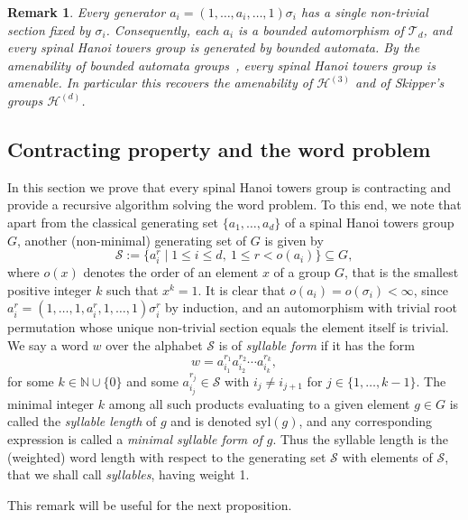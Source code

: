 \documentclass[11pt,leqno]{amsart}
\theoremstyle{plain}
\newtheorem{remark}[remark]{Remark}
\newcommand\T{{\mathcal{T}}}
\newcommand{\Syl}{\mathrm{syl}}
\numberwithin{equation}{section}
\begin{document}
\begin{remark}\label{remarkamenabke}
	Every generator $a_i=(1,\dots,a_i,\dots,1)\sigma_i$ has a single non-trivial
	section fixed by $\sigma_i$. Consequently, each
	$a_i$ is a bounded automorphism of $\T_d$, and every spinal Hanoi towers
	group is generated by bounded automata. By the amenability of bounded automata groups~\cite{BartholdiKaimanovichNekrashevych10}, every spinal Hanoi towers group
	is amenable. In particular this recovers the amenability of $\mathcal{H}^{(3)}$
	and of Skipper's groups $\mathcal{H}^{(d)}$.
\end{remark}

\subsection{Contracting property and the word problem}\label{sec:contracting}

In this section we prove that every spinal Hanoi towers group is contracting and provide a recursive algorithm solving the word problem. To this end, we note that apart from the classical generating set $\{a_1,\dots,a_d\}$ of a spinal Hanoi towers group $G$, another (non-minimal) generating set of $G$ is given by 
\[
\mathcal{S}:=\{ a_i^r \mid 1\le i\le d,\ 1\le r< o(a_i) \}\subseteq G, 
\]
where $o(x)$ denotes the order of an element $x$ of a group $G$, that is the smallest positive integer $k$ such that $x^k=1$. It is clear that $o(a_i)=o(\sigma_i)<\infty$, since $a_i^r=(1,\dots,1,a_i^r,1,\dots,1)\sigma_i^r$ by induction, and an automorphism with trivial root permutation whose unique non-trivial section equals the element itself is trivial.
We say a word $w$ over the alphabet $\mathcal{S}$ is of \emph{syllable form} if it has the form
\[
w  =  a_{i_1}^{ r_1} a_{i_2}^{ r_2}\cdots a_{i_k}^{ r_k},
\]
for some $k\in \mathbb{N}\cup\{0\}$ and some $a_{i_j}^{ r_j}\in \mathcal{S}$ with $i_j\neq i_{j+1}$ for $j\in\{1,\ldots,k-1\}$. The minimal integer $k$ among all such products evaluating  to a given element $g\in G$ is called the \emph{syllable length} of $g$ and is denoted $\Syl(g)$, and any corresponding expression is called a \emph{minimal syllable form of $g$}. Thus the syllable length is the (weighted) word length with respect to the generating set $\mathcal{S}$ with elements of $\mathcal{S}$, that we shall call \emph{syllables}, having weight 1. 

This remark will be useful for the next proposition.
\end{document}
